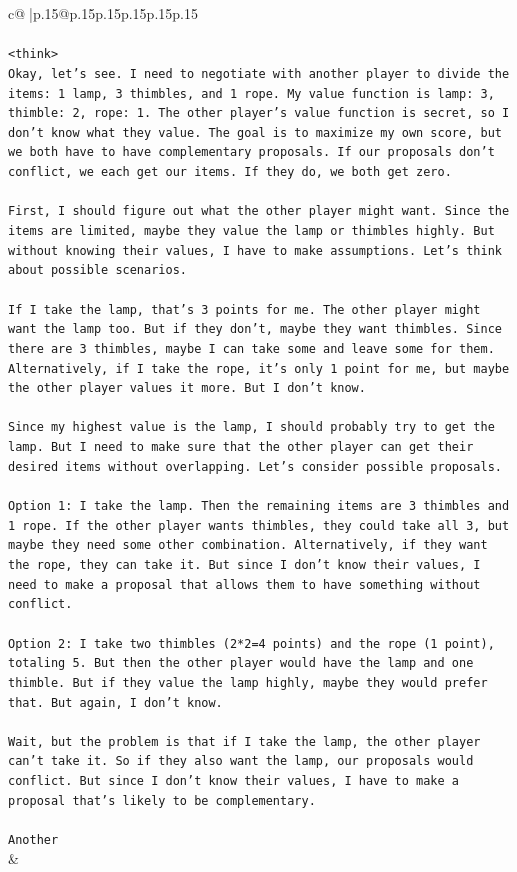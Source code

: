 \documentclass{article}
\begin{document}
{\begin{supertabular}{c@{$\;$}|p{.15\linewidth}@{}p{.15\linewidth}p{.15\linewidth}p{.15\linewidth}p{.15\linewidth}p{.15\linewidth}}
{{{\\ 
\\ 
\texttt{<think>} \\
\texttt{Okay, let's see. I need to negotiate with another player to divide the items: 1 lamp, 3 thimbles, and 1 rope. My value function is lamp: 3, thimble: 2, rope: 1. The other player's value function is secret, so I don't know what they value. The goal is to maximize my own score, but we both have to have complementary proposals. If our proposals don't conflict, we each get our items. If they do, we both get zero.} \\
\\ 
\texttt{First, I should figure out what the other player might want. Since the items are limited, maybe they value the lamp or thimbles highly. But without knowing their values, I have to make assumptions. Let's think about possible scenarios.} \\
\\ 
\texttt{If I take the lamp, that's 3 points for me. The other player might want the lamp too. But if they don't, maybe they want thimbles. Since there are 3 thimbles, maybe I can take some and leave some for them. Alternatively, if I take the rope, it's only 1 point for me, but maybe the other player values it more. But I don't know.} \\
\\ 
\texttt{Since my highest value is the lamp, I should probably try to get the lamp. But I need to make sure that the other player can get their desired items without overlapping. Let's consider possible proposals.} \\
\\ 
\texttt{Option 1: I take the lamp. Then the remaining items are 3 thimbles and 1 rope. If the other player wants thimbles, they could take all 3, but maybe they need some other combination. Alternatively, if they want the rope, they can take it. But since I don't know their values, I need to make a proposal that allows them to have something without conflict.} \\
\\ 
\texttt{Option 2: I take two thimbles (2*2=4 points) and the rope (1 point), totaling 5. But then the other player would have the lamp and one thimble. But if they value the lamp highly, maybe they would prefer that. But again, I don't know.} \\
\\ 
\texttt{Wait, but the problem is that if I take the lamp, the other player can't take it. So if they also want the lamp, our proposals would conflict. But since I don't know their values, I have to make a proposal that's likely to be complementary.} \\
\\ 
\texttt{Another} \\
            }
        }
    }
    & \\ \\


\end{supertabular}}
\end{document}
